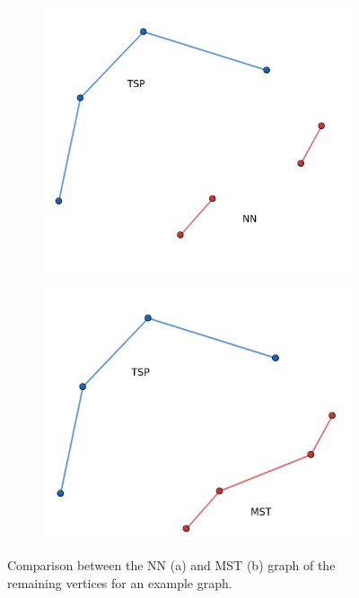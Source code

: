 \begin{figure}[H]
\centering
\begin{subfigure}[c]{0.45\textwidth}
\includegraphics[width=\textwidth]{./assets/nn.png}
\caption{} %
\centering
\end{subfigure}
\centering
\begin{subfigure}[c]{0.45\textwidth}
\includegraphics[width=\textwidth]{./assets/mst.png}
\caption{} %
\centering
\end{subfigure}
\caption{Comparison between the \ac{NN} (a) and \ac{MST} (b) graph of the remaining vertices for an example graph.}
\end{figure}

